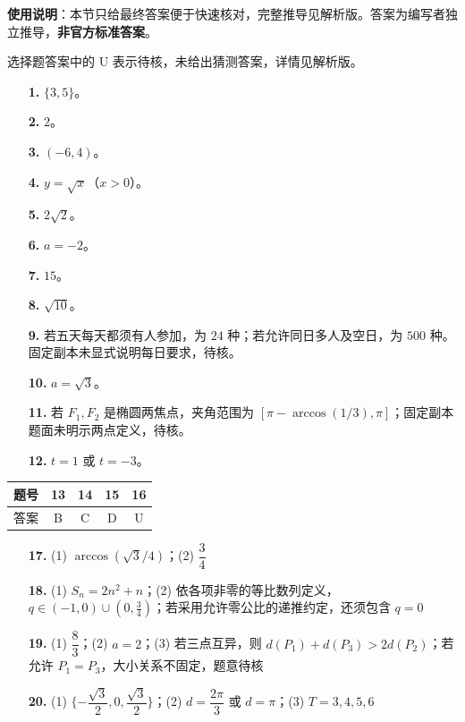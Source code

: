 
\begin{gknotice}
\textbf{使用说明}：本节只给最终答案便于快速核对，完整推导见解析版。答案为编写者独立推导，\textbf{非官方标准答案}。
\end{gknotice}

\begin{gknotice}
选择题答案中的 U 表示待核，未给出猜测答案，详情见解析版。
\end{gknotice}

\begin{itemize}[leftmargin=2.6em]
  \item[\textbf{1.}] $\{3,5\}$。
  \item[\textbf{2.}] $2$。
  \item[\textbf{3.}] $(-6,4)$。
  \item[\textbf{4.}] $y=\sqrt{x}$（$x>0$）。
  \item[\textbf{5.}] $2\sqrt2$。
  \item[\textbf{6.}] $a=-2$。
  \item[\textbf{7.}] $15$。
  \item[\textbf{8.}] $\sqrt{10}$。
  \item[\textbf{9.}] 若五天每天都须有人参加，为 $24$ 种；若允许同日多人及空日，为 $500$ 种。固定副本未显式说明每日要求，待核。
  \item[\textbf{10.}] $a=\sqrt3$。
  \item[\textbf{11.}] 若 $F_1,F_2$ 是椭圆两焦点，夹角范围为 $[\pi-\arccos(1/3),\pi]$；固定副本题面未明示两点定义，待核。
  \item[\textbf{12.}] $t=1$ 或 $t=-3$。
\end{itemize}

\begin{center}\begin{tabular}{ccccc}
\toprule
题号 & 13 & 14 & 15 & 16 \\
\midrule
答案 & B & C & D & U \\
\bottomrule
\end{tabular}\end{center}

\begin{itemize}[leftmargin=2.6em]
  \item[\textbf{17.}] (1) $\arccos(\sqrt3/4)$；(2) $\dfrac34$
  \item[\textbf{18.}] (1) $S_n=2n^2+n$；(2) 依各项非零的等比数列定义，$q\in(-1,0)\cup(0,\frac34)$；若采用允许零公比的递推约定，还须包含 $q=0$
  \item[\textbf{19.}] (1) $\dfrac83$；(2) $a=2$；(3) 若三点互异，则 $d(P_1)+d(P_3)>2d(P_2)$；若允许 $P_1=P_3$，大小关系不固定，题意待核
  \item[\textbf{20.}] (1) $\{-\dfrac{\sqrt3}{2},0,\dfrac{\sqrt3}{2}\}$；(2) $d=\dfrac{2\pi}{3}$ 或 $d=\pi$；(3) $T=3,4,5,6$
\end{itemize}
